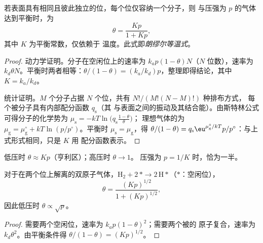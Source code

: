 \begin{theorem}[朗缪尔等温式]\label{thm:b3:surfaces-catalysis:langmuir}
若表面具有相同且彼此独立的位，每个位仅容纳一个分子，则
与压强为 $p$ 的气体达到平衡时，为
\[
  \theta = \frac{Kp}{1 + Kp},
\]
其中 $K$ 为平衡常数，仅依赖于
温度。此式即\emph{朗缪尔等温式}。
\end{theorem}

\begin{proof}
动力学证明。分子在空闲位上的速率为 $k_ap(1 - \theta)N$（$N$
位数），速率为 $k_d\theta N$。平衡时两者相等：$\theta/(1 - \theta)
= (k_a/k_d)p$，整理即得结论，其中 $K = k_a/k_d$。

统计证明。$M$ 个分子占据 $N$ 个位，共有 $N!/(M!(N - M)!)$ 种排布方式，
每个被分子具有内部配分函数 $q_{\mathrm s}$（其
与表面之间的振动及其结合能）。由斯特林公式
可得分子的化学势为 $\mu_{\mathrm s} = -kT\ln\bigl(q_{\mathrm s}\frac{1 - \theta}{\theta}\bigr)$；
理想气体的为 $\mu_{\mathrm g} = \mu_{\mathrm g}^\circ + kT\ln(p/p^\circ)$。平衡时 $\mu_{\mathrm s} = \mu_{\mathrm g}$，得
$\theta/(1 - \theta) = q_{\mathrm s}\eu^{\mu_{\mathrm g}^\circ/kT}p/p^\circ$：与上式形式相同，只是 $K$ 用
配分函数表示。
\end{proof}

低压时 $\theta \approx Kp$（亨利区）；高压时 $\theta \to 1$。
压强为 $p = 1/K$ 时，恰为一半。

\begin{proposition}[解离吸附]\label{prop:b3:surfaces-catalysis:dissociative}
对于在两个位上解离的双原子气体，$\mathrm{H_2} + 2\,{*} \to 2\,\mathrm{H}{*}$（${*}$：空闲位），
\[
  \theta = \frac{(Kp)^{1/2}}{1 + (Kp)^{1/2}},
\]
因此低压时 $\theta \propto \sqrt p$。
\end{proposition}

\begin{proof}
需要两个空闲位，速率为 $k_ap(1 - \theta)^2$；需要两个被的
原子复合，速率为 $k_d\theta^2$。由平衡条件得 $\theta/(1 - \theta) =
(Kp)^{1/2}$。
\end{proof}

